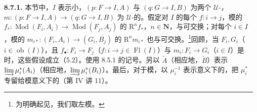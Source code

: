 \textbf{8.7.1.} 本节中，$I$ 表示小，$(p:F\to I,A)$ 与 $(q:G\to I,B)$ 为两个 $\mathcal U$-，$m:(p:F\to I,A)\to(q:G\to I,B)$ 为 $\mathcal U$-的。假定对 $I$ 的每个 $f:i\to j$，模的 $f_*:\operatorname{Mod}(F_i,A_i)\to\operatorname{Mod}(F_j,A_j)$ 的 $\mathrm R^nf_*$，$n\in\mathbf N$，与可交换；对每个 $i\in I$，模的 $m_{i*}:(F_i,A_i)\to(G_i,B_j)$ 的 $\mathrm R^nm_{i*}$ 也与可交换。\footnote{为明确起见，我们取左模。}回顾，当 $F_i,G_i$（$i\in\operatorname{ob}(I)$），且 $f_\bullet:F_i\to F_j$（$f:i\to j\in\operatorname{Fl}(I)$）与 $m_i:F_i\to G_i$（$i\in I$）是时，这些假设成立（5.2）。使用 8.5.1 的记号。另以 $\underrightarrow A$（相应地，$\underrightarrow B$）表示 $\varinjlim\mu_i^*(A_i)$（相应地，$\varinjlim\mu_i^*(B_i)$）。最后，对于模，以 $\mu_i^{-1}$ 表示意义下的，把 $\mu_i^*$ 专留给模意义下的（第 IV 讲 11）。

